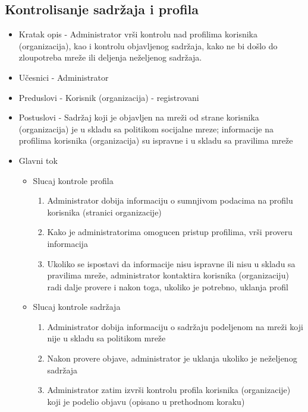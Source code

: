 \subsection{Kontrolisanje sadržaja i profila}
\begin{itemize}
	\item Kratak opis - Administrator vrši kontrolu nad profilima korisnika (organizacija), kao i kontrolu objavljenog sadržaja, kako ne bi došlo do zloupotreba mreže ili deljenja neželjenog sadržaja. 
	\item Učesnici - Administrator
	\item Preduslovi - Korisnik (organizacija) - registrovani
	\item Postuslovi - Sadržaj koji je objavljen na mreži od strane korisnika (organizacija) je u skladu sa politikom socijalne mreze;
	informacije na profilima korisnika (organizacija) su ispravne i u skladu sa pravilima mreže
	\item Glavni tok
	\begin{itemize}
	\item Slucaj kontrole profila
	\begin{enumerate}
		\item Administrator dobija informaciju o sumnjivom podacima na profilu korisnika (stranici organizacije)
		\item Kako je administratorima omogucen pristup profilima, vrši proveru informacija
		\item Ukoliko se ispostavi da informacije nisu ispravne ili nisu u skladu sa pravilima mreže, administrator kontaktira korisnika (organizaciju) radi dalje provere i nakon toga, ukoliko je potrebno, uklanja profil
	\end{enumerate}
	\end{itemize}
	\begin{itemize}
		\item Slucaj kontrole sadržaja
	\begin{enumerate}
		\item Administrator dobija informaciju o sadržaju podeljenom na mreži koji nije u skladu sa politikom mreže
		\item Nakon provere objave, administrator je uklanja ukoliko je neželjenog sadržaja 
		\item Administrator zatim izvrši kontrolu profila korisnika (organizacije) koji je podelio objavu (opisano u prethodnom koraku)
	\end{enumerate}
	\end{itemize}
\end{itemize}


